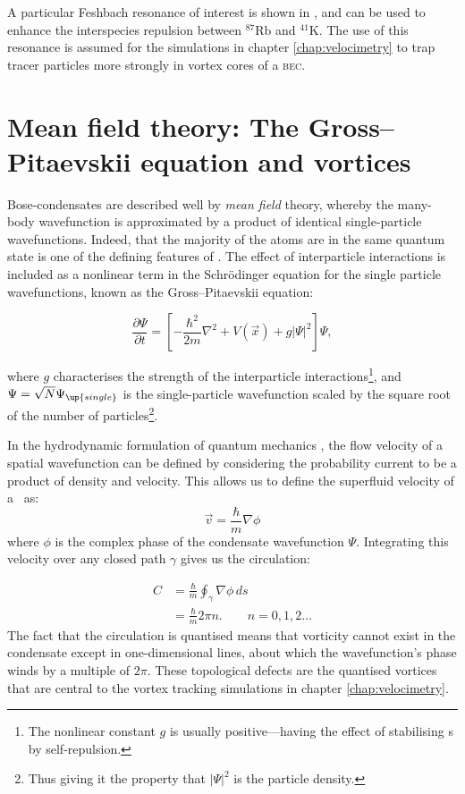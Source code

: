 A particular Feshbach resonance of interest is shown in , and can be used to enhance the interspecies repulsion between $^{87}$Rb and $^{41}$K. The use of this resonance is assumed for the simulations in chapter \ref{chap:velocimetry} to trap tracer particles more strongly in vortex cores of a \textsc{bec}.

\section{Mean field theory: The Gross--Pitaevskii equation and vortices}\label{sec:mean_field_theory}

Bose-condensates are described well by \emph{mean field} theory, whereby the many-body wavefunction is approximated by a product of identical single-particle wavefunctions. Indeed, that the majority of the atoms are in the same quantum state is one of the defining features of \bec. The effect of interparticle interactions is included as a nonlinear term in the Schr\"odinger equation for the single particle wavefunctions, known as the Gross--Pitaevskii equation:

\begin{equation}
\frac{\partial \Psi}{\partial t} = \left[-\frac{\hbar^2}{2m}\nabla^2 + V(\vec{x}) + g|\Psi|^2\right]\Psi,
\end{equation}

where $g$ characterises the strength of the interparticle interactions\footnote{The nonlinear constant $g$ is usually positive---having the effect of stabilising \bec s by self-repulsion.}, and $\Psi = \sqrt{N}\Psi_\up{single}$ is the single-particle wavefunction scaled by the square root of the number of particles\footnote{Thus giving it the property that $|\Psi|^2$ is the particle density.}.

In the hydrodynamic formulation of quantum mechanics \cite{madelung_quantentheorie_1927}, the flow velocity of a spatial wavefunction can be defined by considering the probability current to be a product of density and velocity. This allows us to define the superfluid velocity of a \bec\ as:
\begin{equation}
\vec v = \frac\hbar m \nabla\phi
\end{equation}
where $\phi$ is the complex phase of the condensate wavefunction $\Psi$. Integrating this velocity over any closed path $\gamma$ gives us the circulation:

\begin{align}
C &= \frac\hbar m\oint_\gamma\nabla\phi\,ds\\
  &= \frac\hbar m 2\pi n.\qquad n=0,1,2\dots
\end{align}
The fact that the circulation is quantised means that vorticity cannot exist in the condensate except in one-dimensional lines, about which the wavefunction's phase winds by a multiple of $2\pi$. These topological defects are the quantised vortices that are central to the vortex tracking simulations in chapter \ref{chap:velocimetry}.

